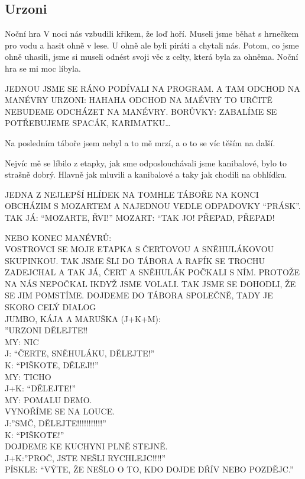 \subsection*{Urzoni} %
\label{sub:urzoni}

\begin{multicols}{2}
	
Noční hra
V noci nás vzbudili křikem, že loď hoří. Museli jsme běhat s hrnečkem pro vodu a hasit ohně v lese. U ohně ale byli piráti a chytali nás. Potom, co jsme ohně uhasili, jsme si museli odnést svoji věc z celty, která byla za ohněma. Noční hra se mi moc líbyla.


JEDNOU JSME SE RÁNO PODÍVALI NA PROGRAM. A TAM ODCHOD NA MANÉVRY URZONI: HAHAHA ODCHOD NA MAÉVRY TO URČITĚ NEBUDEME ODCHÁZET NA MANÉVRY. BORŮVKY: ZABALÍME SE POTŘEBUJEME SPACÁK, KARIMATKU…


Na posledním táboře jsem nebyl a to mě mrzí, a o to se víc těším na další.


Nejvíc mě se líbilo z etapky, jak sme odposlouchávali jsme kanibalové, bylo to strašně dobrý. Hlavně jak mluvili a kanibalové a taky jak chodili na obhlídku.



JEDNA Z NEJLEPŠÍ HLÍDEK  NA TOMHLE TÁBOŘE
NA KONCI OBCHÁZIM S MOZARTEM A NAJEDNOU VEDLE ODPADOVKY “PRÁSK”. TAK JÁ: “MOZARTE, ŘVI!” MOZART: “TAK JO! PŘEPAD, PŘEPAD!

NEBO KONEC MANÉVRŮ:\\
VOSTROVCI SE MOJE ETAPKA S ČERTOVOU A SNĚHULÁKOVOU SKUPINKOU. TAK JSME ŠLI DO TÁBORA A RAFÍK SE TROCHU ZADEJCHAL A TAK JÁ, ČERT A SNĚHULÁK POČKALI S NÍM. PROTOŽE NA NÁS NEPOČKAL IKDYŽ JSME VOLALI. TAK JSME SE DOHODLI, ŽE SE JIM POMSTÍME. DOJDEME DO TÁBORA SPOLEČNĚ, TADY JE SKORO CELÝ DIALOG\\
JUMBO, KÁJA A MARUŠKA (J+K+M):\\
”URZONI DĚLEJTE!!\\
MY: NIC\\
J: “ČERTE, SNĚHULÁKU, DĚLEJTE!”\\
K: “PIŠKOTE, DĚLEJ!!”\\
MY: TICHO\\
J+K: “DĚLEJTE!”\\
MY: POMALU DEMO.\\
VYNOŘÍME SE NA LOUCE.\\
J:”SMČ, DĚLEJTE!!!!!!!!!!!”\\
K: “PIŠKOTE!”\\
DOJDEME KE KUCHYNI PLNĚ STEJNĚ.\\
J+K:”PROČ, JSTE NEŠLI RYCHLEJC!!!!”\\
PÍSKLE: “VÝTE, ŽE NEŠLO O TO, KDO DOJDE DŘÍV NEBO POZDĚJC.”


\end{multicols}
